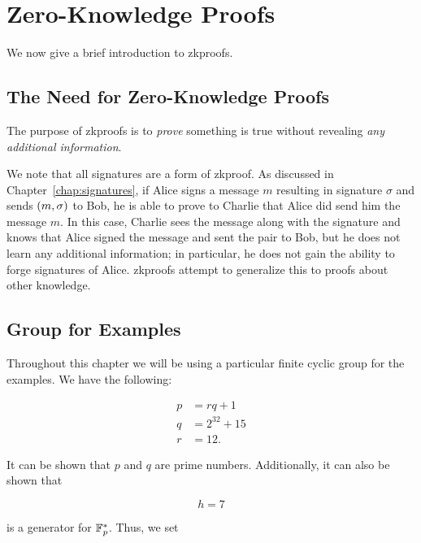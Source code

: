 \chapter{Zero-Knowledge Proofs}
\label{chap:zkproofs}

We now give a brief introduction to \glspl{zkproof}.



\section{The Need for Zero-Knowledge Proofs}

The purpose of \glspl{zkproof} is to \emph{prove}
something is true without revealing \emph{any additional information}.

We note that all \glspl{signature} are a form of \gls{zkproof}.
As discussed in Chapter~\ref{chap:signatures},
if Alice signs a message $m$ resulting in signature $\sigma$
and sends $\left( m,\sigma \right)$ to Bob,
he is able to prove to Charlie that Alice did send him the message $m$.
In this case, Charlie sees the message along with the signature
and knows that Alice signed the message and sent the pair to Bob,
but he does not learn any additional information;
in particular, he does not gain the ability to forge
signatures of Alice.
\Glspl{zkproof} attempt to generalize this to proofs about
other knowledge.



\section{Group for Examples}
\label{sec:zkproofs_group}

Throughout this chapter we will be using a particular
\gls{finite cyclic group} for the examples.
We have the following:

\begin{align}
    p &= rq + 1 \nonumber\\
    q &= 2^{32} + 15 \nonumber\\
    r &= 12.
\end{align}

\noindent
It can be shown that $p$ and $q$ are prime numbers.
Additionally, it can also be shown that

\begin{equation}
    h = 7
\end{equation}

\noindent
is a generator for $\mathbb{F}_{p}^{*}$.
Thus, we set

